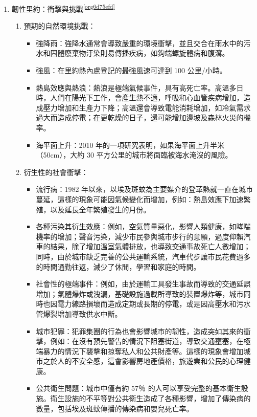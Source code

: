 \documentclass[a4paper,12pt]{article}
\begin{document}
\begin{enumerate}
\item 韌性里約：衝擊與挑戰\textsuperscript{\ref{org6d75efd}}
\label{sec:orgb81dd69}
\begin{enumerate}
\item 預期的自然環境挑戰：
\label{sec:org2bad813}
\begin{itemize}
\item 強降雨：強降水通常會導致嚴重的環境衝擊，並且交合在雨水中的污水和固體廢棄物汙染則易傳播疾病，如鉤端螺旋體病和腹瀉。\\
\item 強風：在里約熱內盧登記的最強風速可達到 100 公里/小時。\\
\item 熱島效應與熱浪：熱浪是極端氣候事件，具有高死亡率。高溫多日時，人們在陽光下工作，會產生熱不適，呼吸和心血管疾病增加，造成壓力增加和生產力下降；高溫還會導致電能消耗增加，如冷氣需求過大而造成停電；在更乾燥的日子，還可能增加邊坡及森林火災的機率。\\
\item 海平面上升：2010 年的一項研究表明，如果海平面上升半米（50cm），大約 30 平方公里的城市將面臨被海水淹沒的風險。\\
\end{itemize}
\item 衍生性的社會衝擊：
\label{sec:org8917a3e}
\begin{itemize}
\item 流行病：1982 年以來，以埃及斑蚊為主要媒介的登革熱就一直在城市蔓延，這樣的現象可能因氣候變化而增加，例如：熱島效應下加速繁殖，以及延長全年繁殖發生的月份。\\
\item 各種污染其衍生效應：例如，空氣質量惡化，影響人類健康，如哮喘機率的增加；聲音污染，減少市民參與城市步行的意願，過度仰賴汽車的結果，除了增加溫室氣體排放，也導致交通事故死亡人數增加；同時，由於城市缺乏完善的公共運輸系統，汽車代步讓市民花費過多的時間通勤往返，減少了休閒，學習和家庭的時間。\\
\item 社會性的極端事件：例如，由於運輸工具發生事故而導致的交通延誤增加；氣體爆炸或洩漏，基礎設施過載所導致的裝置爆炸等，城市同時也因電力線路損壞而造成定期或長期的停電，或是因高壓水和污水管爆裂增加導致供水中斷。\\
\item 城市犯罪：犯罪集團的行為也會影響城市的韌性，造成突如其來的衝擊，例如：在沒有預先警告的情況下阻塞街道，導致交通壅塞，在極端暴力的情況下襲擊和掠奪私人和公共財產等。這樣的現象會增加城市之於人的不安全感，這會影響房地產價格，旅遊業和公民的心理健康。\\
\item 公共衛生問題：城市中僅有約 57％ 的人可以享受完整的基本衛生設施。衛生設施的不平等對公共衛生造成了各種影響，增加了傳染病的數量，包括埃及斑蚊傳播的傳染病和嬰兒死亡率。\\
\end{itemize}
\end{enumerate}


\end{enumerate}
\end{document}

